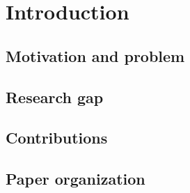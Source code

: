 \section{Introduction}
\label{sec:introduction}


\subsection{Motivation and problem}
\label{sec:introduction:motivation}

\subsection{Research gap}
\label{sec:introduction:gap}

\subsection{Contributions}
\label{sec:introduction:contributions}

\subsection{Paper organization}
\label{sec:introduction:organization}
